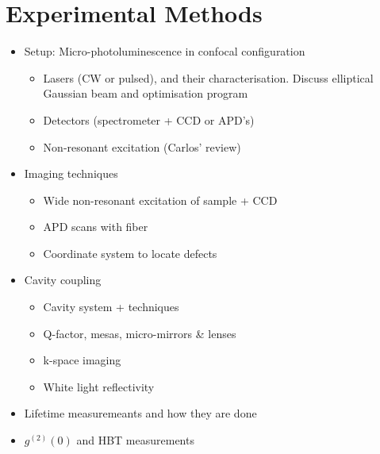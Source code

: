 \section{Experimental Methods}

\begin{itemize}
    \item Setup: Micro-photoluminescence in confocal configuration 
    \begin{itemize}
        \item Lasers (CW or pulsed), and their characterisation. Discuss elliptical Gaussian beam and optimisation program
        \item Detectors (spectrometer + CCD or APD's)
        \item Non-resonant excitation (Carlos' review)
    \end{itemize}
    \item Imaging techniques
    \begin{itemize}
        \item Wide non-resonant excitation of sample + CCD
        \item APD scans with fiber
        \item Coordinate system to locate defects
    \end{itemize}
    \item Cavity coupling 
    \begin{itemize}
        \item Cavity system + techniques 
        \item Q-factor, mesas, micro-mirrors \& lenses
        \item k-space imaging 
        \item White light reflectivity
    \end{itemize}
    \item Lifetime measuremeants and how they are done
    \item $g^{(2)}(0)$ and HBT measurements
\end{itemize}